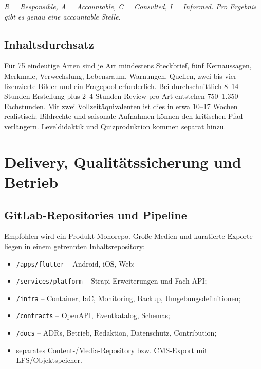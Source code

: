 \documentclass[10pt,a4paper,oneside]{article}
\newcommand{\Code}[1]{\texttt{\small #1}}
\begin{document}
\textit{R = Responsible, A = Accountable, C = Consulted, I = Informed. Pro Ergebnis gibt es genau eine accountable Stelle.}

\subsection{Inhaltsdurchsatz}

Für 75 eindeutige Arten sind je Art mindestens Steckbrief, fünf Kernaussagen, Merkmale, Verwechslung, Lebensraum, Warnungen, Quellen, zwei bis vier lizenzierte Bilder und ein Fragepool erforderlich. Bei durchschnittlich 8--14 Stunden Erstellung plus 2--4 Stunden Review pro Art entstehen 750--1.350 Fachstunden. Mit zwei Vollzeitäquivalenten ist dies in etwa 10--17 Wochen realistisch; Bildrechte und saisonale Aufnahmen können den kritischen Pfad verlängern. Leveldidaktik und Quizproduktion kommen separat hinzu.

\section{Delivery, Qualitätssicherung und Betrieb}\label{sec:delivery}

\subsection{GitLab-Repositories und Pipeline}

Empfohlen wird ein Produkt-Monorepo. Große Medien und kuratierte Exporte liegen in einem getrennten Inhaltsrepository:

\begin{itemize}
  \item \Code{/apps/flutter} -- Android, iOS, Web;
  \item \Code{/services/platform} -- Strapi-Erweiterungen und Fach-API;
  \item \Code{/infra} -- Container, IaC, Monitoring, Backup, Umgebungsdefinitionen;
  \item \Code{/contracts} -- OpenAPI, Eventkatalog, Schemas;
  \item \Code{/docs} -- ADRs, Betrieb, Redaktion, Datenschutz, Contribution;
  \item separates Content-/Media-Repository bzw. CMS-Export mit LFS/Objektspeicher.
\end{itemize}
\end{document}
